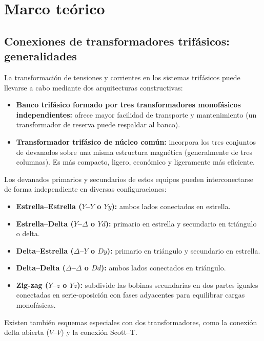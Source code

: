 \documentclass[12pt]{article}
\begin{document}
\newpage

\section{Marco te\'orico}
\subsection{Conexiones de transformadores trif\'asicos: generalidades}

La transformaci\'on de tensiones y corrientes en los sistemas trif\'asicos puede llevarse a cabo mediante dos arquitecturas constructivas:
\begin{itemize}
    \item \textbf{Banco trif\'asico formado por tres transformadores monof\'asicos independientes:} ofrece mayor facilidad de transporte y mantenimiento (un transformador de reserva puede respaldar al banco).
    \item \textbf{Transformador trif\'asico de n\'ucleo com\'un:} incorpora los tres conjuntos de devanados sobre una misma estructura magn\'etica (generalmente de tres columnas). Es m\'as compacto, ligero, econ\'omico y ligeramente m\'as eficiente.
\end{itemize}

Los devanados primarios y secundarios de estos equipos pueden interconectarse de forma independiente en diversas configuraciones:
\begin{itemize}
    \item \textbf{Estrella--Estrella ($Y$--$Y$ o $Yy$):} ambos lados conectados en estrella.
    \item \textbf{Estrella--Delta ($Y$--$\Delta$ o $Yd$):} primario en estrella y secundario en tri\'angulo o delta.
    \item \textbf{Delta--Estrella ($\Delta$--$Y$ o $Dy$):} primario en tri\'angulo y secundario en estrella.
    \item \textbf{Delta--Delta ($\Delta$--$\Delta$ o $Dd$):} ambos lados conectados en tri\'angulo.
    \item \textbf{Zig-zag ($Y$--$z$ o $Yz$):} subdivide las bobinas secundarias en dos partes iguales conectadas en serie-oposici\'on con fases adyacentes para equilibrar cargas monof\'asicas.
\end{itemize}

Existen tambi\'en esquemas especiales con dos transformadores, como la conexi\'on delta abierta ($V$--$V$) y la conexi\'on Scott--T.
\end{document}

